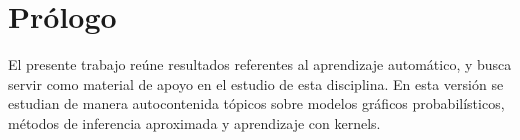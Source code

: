 %

\chapter*{Prólogo}

El presente trabajo reúne resultados referentes al aprendizaje automático,
y busca servir como material de apoyo en el estudio de esta disciplina. En esta versión se estudian de manera autocontenida tópicos sobre modelos
gráficos probabilísticos, métodos de inferencia aproximada y aprendizaje con
kernels.



